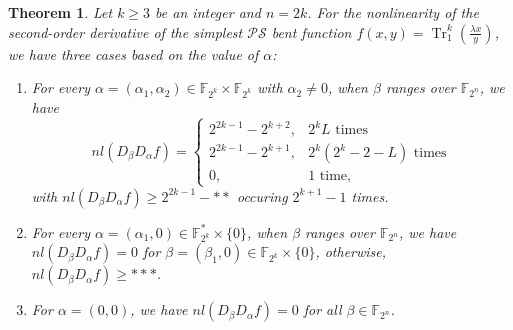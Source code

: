 \documentclass{article}
\newcommand{\F}{\mathbb{F}}
\newcommand{\0}{\textbf{0}}
\newcommand{\1}{\textbf{1}}
\newcommand{\TRACE}{\operatorname{Tr}_1^k}
\theoremstyle{plain}
\newtheorem{theorem}{Theorem}
\theoremstyle{nonumberplain}
\begin{document}
    \begin{theorem}\label{thm:nl_DaDbf}
        Let $ k\ge 3 $ be an integer and $ n=2k $. 
        For the nonlinearity of the second-order derivative of 
        the simplest $ \mathcal{PS} $ bent function $ f(x,y)=\TRACE(\frac{\lambda x}{y}) $, 
        we have three cases based on the value of $ \alpha $:
        \begin{enumerate}[label=(\arabic{*})]
            \item For every $ \alpha=(\alpha_1,\alpha_2)\in\F_{2^k}\times\F_{2^k} $ with $ \alpha_2\ne 0 $, 
            when $ \beta $ ranges over $ \F_{2^n} $, we have 
            \begin{equation}\label{res:nontrivil_nl}
                nl(D_{\beta}D_{\alpha}f)=\begin{cases}
                    2^{2k-1}-2^{k+2},&2^kL\text{~times}\\
                    2^{2k-1}-2^{k+1},&2^k(2^k-2-L)\text{~times}\\
                    0,&1\text{~time},%
                \end{cases}
            \end{equation}
            with $ nl(D_{\beta}D_{\alpha}f)\ge 2^{2k-1}-** $ occuring $ 2^{k+1}-1 $ times.
            \item For every $ \alpha=(\alpha_1,0)\in\F_{2^k}^*\times\{0\} $, when $ \beta $ ranges over $ \F_{2^n} $, 
            we have $ nl(D_{\beta}D_{\alpha}f)=0 $ for $ \beta=(\beta_1,0)\in\F_{2^k}\times\{0\} $, 
            otherwise, $ nl(D_{\beta}D_{\alpha}f)\ge *** $. 
            \item For $ \alpha=(0,0) $, we have $ nl(D_{\beta}D_{\alpha}f) = 0 $ for all $ \beta\in\F_{2^n} $.
        \end{enumerate} 
    \end{theorem}
\end{document}
